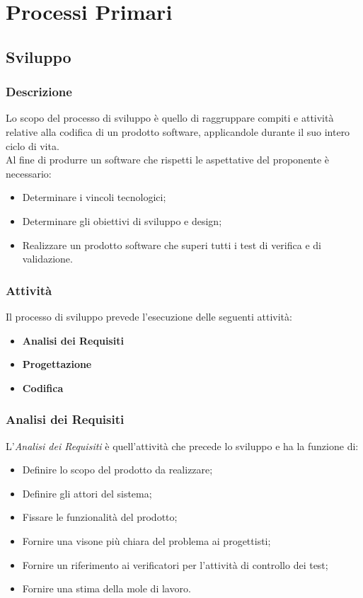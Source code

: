 \chapter{Processi Primari}

\section{Sviluppo}

\subsection{Descrizione}
  Lo scopo del processo di sviluppo è quello di raggruppare compiti e attività relative alla codifica di un prodotto software, applicandole durante il suo intero ciclo di vita. \\
  Al fine di produrre un software che rispetti le aspettative del proponente è necessario: 
  \begin{itemize}
    \item Determinare i vincoli tecnologici;
    \item Determinare gli obiettivi di sviluppo e design;
    \item Realizzare un prodotto software che superi tutti i test di verifica e di validazione.
  \end{itemize}
  \subsection{Attività}

  Il processo di sviluppo prevede l'esecuzione delle seguenti attività:
  \begin{itemize}
    \item \textbf{Analisi dei Requisiti}
    \item \textbf{Progettazione}
    \item \textbf{Codifica}
  \end{itemize}
  \subsection{Analisi dei Requisiti}
    L'\textit{Analisi dei Requisiti} è quell'attività che precede lo sviluppo e ha la funzione di:
    \begin{itemize}
      \item Definire lo scopo del prodotto da realizzare;
      \item Definire gli attori del sistema;
      \item Fissare le funzionalità del prodotto;
      \item Fornire una visone più chiara del problema ai progettisti;
      \item Fornire un riferimento ai verificatori per l'attività di controllo dei test;
      \item Fornire una stima della mole di lavoro.
    \end{itemize}
